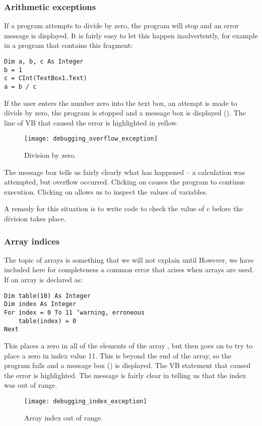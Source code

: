 			\subsubsection*{Arithmetic exceptions}
				If a program attempts to divide by zero, the program will stop and an error message is displayed. It is fairly easy to let this happen inadvertently, for example in a program that contains this fragment:
				\begin{lstlisting}
Dim a, b, c As Integer
b = 1
c = CInt(TextBox1.Text)
a = b / c
				\end{lstlisting}
				If the user enters the number zero into the text box, an attempt is made to divide by zero, the program is stopped and a message box is displayed (). The line of VB that caused the error is highlighted in yellow.
				\begin{figure}[bth]
					\centering
					\texttt{[image: debugging\_overflow\_exception]}
					\caption{Division by zero.}
					\label{fig:debugging_overflow_exception}
				\end{figure}

				
				The message box tells us fairly clearly what has happened – a calculation was attempted, but overflow occurred. Clicking on  causes the program to continue execution. Clicking on  allows us to inspect the values of variables.
				
				A remedy for this situation is to write code to check the value of c before the division takes place.


			\subsubsection*{Array indices}
				The topic of arrays is something that we will not explain until  However, we have included here for completeness a common error that arises when arrays are used. If an array is declared as:
				\begin{lstlisting}
Dim table(10) As Integer
Dim index As Integer
For index = 0 To 11 ‘warning, erroneous	
	table(index) = 0
Next
				\end{lstlisting}
				This places a zero in all of the elements of the array , but then goes on to try to place a zero in index value 11. This is beyond the end of the array, so the program fails and a message box () is displayed. The VB statement that caused the error is highlighted. The message is fairly clear in telling us that the index was out of range.
				\begin{figure}[bth]
					\centering
					\texttt{[image: debugging\_index\_exception]}
					\caption{Array index out of range.}
					\label{fig:debugging_index_exception}
				\end{figure}
				
